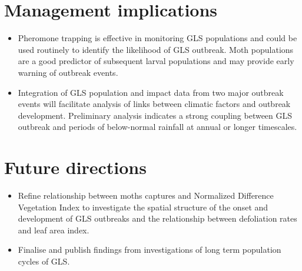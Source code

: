\documentclass[version=last, 
    paper=a4, %
    10pt, %
    usenames,
    dvipsnames, 
    oneside, %
    headings=openany, %
    DIV=15 %
]{scrbook}
\begin{document}
\section*{Management implications}
\begin{itemize}
\itemsep1pt\parskip0pt
\item
  Pheromone trapping is effective in monitoring GLS populations and
  could be used routinely to identify the likelihood of GLS outbreak.
  Moth populations are a good predictor of subsequent larval populations
  and may provide early warning of outbreak events.
\item
  Integration of GLS population and impact data from two major outbreak
  events will facilitate analysis of links between climatic factors and
  outbreak development. Preliminary analysis indicates a strong coupling
  between GLS outbreak and periods of below-normal rainfall at annual or
  longer timescales.
\end{itemize}



\section*{Future directions}
\begin{itemize}
\itemsep1pt\parskip0pt
\item
  Refine relationship between moths captures and Normalized Difference
  Vegetation Index to investigate the spatial structure of the onset and
  development of GLS outbreaks and the relationship between defoliation
  rates and leaf area index.
\item
  Finalise and publish findings from investigations of long term
  population cycles of GLS.
\end{itemize}



\end{document}
